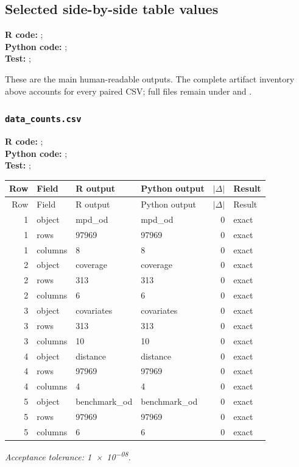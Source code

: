 \documentclass[10pt]{article}
\begin{document}
\subsection{Selected side-by-side table values}
{\footnotesize \textbf{R code:} ; \\ \textbf{Python code:} ; \\ \textbf{Test:} ; \par}


These are the main human-readable outputs. The complete artifact inventory above accounts for every paired CSV; full files remain under  and .

\subsubsection{\texorpdfstring{\texttt{data\_counts.csv}}{data\_counts.csv}}
{\footnotesize \textbf{R code:} ; \\ \textbf{Python code:} ; \\ \textbf{Test:} ; \par}

\small
\begin{longtable}{@{}r p{}p{}p{}rl@{}}
\toprule
Row & Field & R output & Python output & $|\Delta|$ & Result \\
\midrule
\endfirsthead
\toprule
Row & Field & R output & Python output & $|\Delta|$ & Result \\
\midrule
\endhead
1 & object & mpd\_\allowbreak{}od & mpd\_\allowbreak{}od & 0 & exact \\
1 & rows & 97969 & 97969 & 0 & exact \\
1 & columns & 8 & 8 & 0 & exact \\
2 & object & coverage & coverage & 0 & exact \\
2 & rows & 313 & 313 & 0 & exact \\
2 & columns & 6 & 6 & 0 & exact \\
3 & object & covariates & covariates & 0 & exact \\
3 & rows & 313 & 313 & 0 & exact \\
3 & columns & 10 & 10 & 0 & exact \\
4 & object & distance & distance & 0 & exact \\
4 & rows & 97969 & 97969 & 0 & exact \\
4 & columns & 4 & 4 & 0 & exact \\
5 & object & benchmark\_\allowbreak{}od & benchmark\_\allowbreak{}od & 0 & exact \\
5 & rows & 97969 & 97969 & 0 & exact \\
5 & columns & 6 & 6 & 0 & exact \\
\bottomrule
\end{longtable}
\normalsize
\textit{Acceptance tolerance: \num{1e-08}.}
\end{document}
